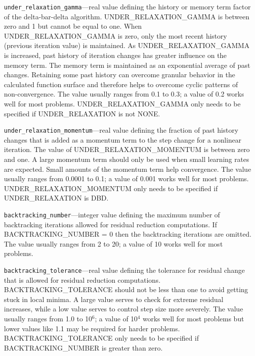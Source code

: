\begin{description}
\item \texttt{under\_relaxation\_gamma}---real value defining the history or memory term factor of the delta-bar-delta algorithm. UNDER\_RELAXATION\_GAMMA is between zero and 1 but cannot be equal to one. When UNDER\_RELAXATION\_GAMMA is zero, only the most recent history (previous iteration value) is maintained. As UNDER\_RELAXATION\_GAMMA is increased, past history of iteration changes has greater influence on the memory term. The memory term is maintained as an exponential average of past changes. Retaining some past history can overcome granular behavior in the calculated function surface and therefore helps to overcome cyclic patterns of non-convergence. The value usually ranges from 0.1 to 0.3; a value of 0.2 works well for most problems. UNDER\_RELAXATION\_GAMMA only needs to be specified if UNDER\_RELAXATION is not NONE.

\item \texttt{under\_relaxation\_momentum}---real value defining the fraction of past history changes that is added as a momentum term to the step change for a nonlinear iteration. The value of UNDER\_RELAXATION\_MOMENTUM is between zero and one. A large momentum term should only be used when small learning rates are expected. Small amounts of the momentum term help convergence. The value usually ranges from 0.0001 to 0.1; a value of 0.001 works well for most problems. UNDER\_RELAXATION\_MOMENTUM only needs to be specified if UNDER\_RELAXATION is DBD.

\item \texttt{backtracking\_number}---integer value defining the maximum number of backtracking iterations allowed for residual reduction computations. If BACKTRACKING\_NUMBER = 0 then the backtracking iterations are omitted. The value usually ranges from 2 to 20; a value of 10 works well for most problems.

\item \texttt{backtracking\_tolerance}---real value defining the tolerance for residual change that is allowed for residual reduction computations. BACKTRACKING\_TOLERANCE should not be less than one to avoid getting stuck in local minima. A large value serves to check for extreme residual increases, while a low value serves to control step size more severely. The value usually ranges from 1.0 to 10$^6$; a value of 10$^4$ works well for most problems but lower values like 1.1 may be required for harder problems. BACKTRACKING\_TOLERANCE only needs to be specified if BACKTRACKING\_NUMBER is greater than zero.


\end{description}
